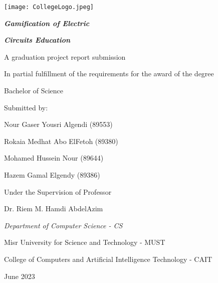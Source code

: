 \documentclass[../main.tex]{subfiles}
\begin{document}
\centering

\hspace{6cm}
\texttt{[image: CollegeLogo.jpeg]}
\vspace{2cm}

\textit{\textbf{\LARGE Gamification of Electric}}

\textit{\textbf{\LARGE Circuits Education}}

\vspace{2cm}
A graduation project report submission

In partial fulfillment of the requirements for the award of the degree

Bachelor of Science

\vspace{2.5cm}
\large
Submitted by:

\vspace{1cm}
Nour Gaser Yousri Algendi (89553)

Rokaia Medhat Abo ElFetoh (89380)

Mohamed Hussein Nour (89644)

 Hazem Gamal Elgendy (89386)
 
\vspace{2.5cm}
Under the Supervision of Professor

Dr. Riem M. Hamdi AbdelAzim

\vspace{2.5cm}
\normalsize
\textit{Department of Computer Science - CS}

Misr University for Science and Technology - MUST

College of Computers and Artificial Intelligence Technology - CAIT

June 2023
\end{document}
